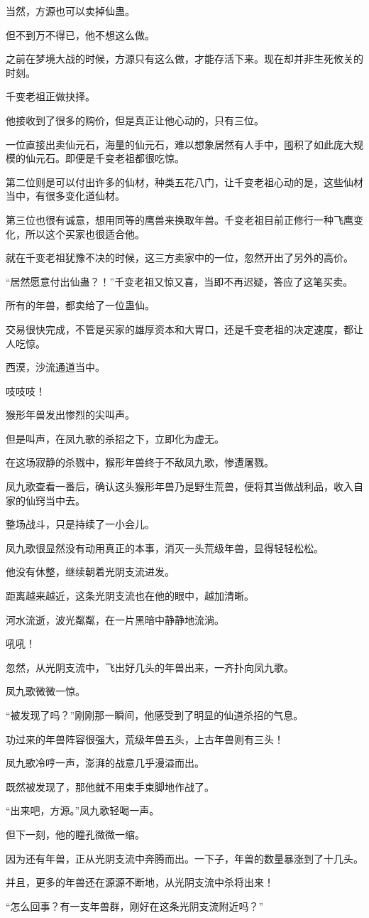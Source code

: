 \begin{this_body}
当然，方源也可以卖掉仙蛊。

但不到万不得已，他不想这么做。

之前在梦境大战的时候，方源只有这么做，才能存活下来。现在却并非生死攸关的时刻。

千变老祖正做抉择。

他接收到了很多的购价，但是真正让他心动的，只有三位。

一位直接出卖仙元石，海量的仙元石，难以想象居然有人手中，囤积了如此庞大规模的仙元石。即便是千变老祖都很吃惊。

第二位则是可以付出许多的仙材，种类五花八门，让千变老祖心动的是，这些仙材当中，有很多变化道仙材。

第三位也很有诚意，想用同等的鹰兽来换取年兽。千变老祖目前正修行一种飞鹰变化，所以这个买家也很适合他。

就在千变老祖犹豫不决的时候，这三方卖家中的一位，忽然开出了另外的高价。

“居然愿意付出仙蛊？！”千变老祖又惊又喜，当即不再迟疑，答应了这笔买卖。

所有的年兽，都卖给了一位蛊仙。

交易很快完成，不管是买家的雄厚资本和大胃口，还是千变老祖的决定速度，都让人吃惊。

西漠，沙流通道当中。

吱吱吱！

猴形年兽发出惨烈的尖叫声。

但是叫声，在凤九歌的杀招之下，立即化为虚无。

在这场寂静的杀戮中，猴形年兽终于不敌凤九歌，惨遭屠戮。

凤九歌查看一番后，确认这头猴形年兽乃是野生荒兽，便将其当做战利品，收入自家的仙窍当中去。

整场战斗，只是持续了一小会儿。

凤九歌很显然没有动用真正的本事，消灭一头荒级年兽，显得轻轻松松。

他没有休整，继续朝着光阴支流进发。

距离越来越近，这条光阴支流也在他的眼中，越加清晰。

河水流逝，波光粼粼，在一片黑暗中静静地流淌。

吼吼！

忽然，从光阴支流中，飞出好几头的年兽出来，一齐扑向凤九歌。

凤九歌微微一惊。

“被发现了吗？”刚刚那一瞬间，他感受到了明显的仙道杀招的气息。

功过来的年兽阵容很强大，荒级年兽五头，上古年兽则有三头！

凤九歌冷哼一声，澎湃的战意几乎漫溢而出。

既然被发现了，那他就不用束手束脚地作战了。

“出来吧，方源。”凤九歌轻喝一声。

但下一刻，他的瞳孔微微一缩。

因为还有年兽，正从光阴支流中奔腾而出。一下子，年兽的数量暴涨到了十几头。

并且，更多的年兽还在源源不断地，从光阴支流中杀将出来！

“怎么回事？有一支年兽群，刚好在这条光阴支流附近吗？”

\end{this_body}

